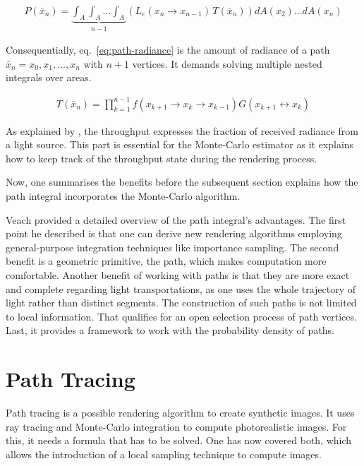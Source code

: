 \begin{align}
P(\bar{x}_n)=\underbrace{\int_A \int_A \dots \int_A}_{n-1}\left(L_e(x_n\rightarrow x_{n-1})\,T(\bar{x}_n) \right)dA(x_2)\dotso dA(x_n)
\label{eq:path-radiance}
\end{align}

Consequentially, eq.~\ref{eq:path-radiance} is the amount of radiance of a path $\bar{x}_n=x_0,x_1,\dotso,x_n$ with $n+1$ vertices.
It demands solving multiple nested integrals over areas.

\begin{align}
T(\bar{x}_n)=\prod_{k=1}^{n-1}f(x_{k+1}\rightarrow x_k\rightarrow x_{k-1})G(x_{k+1}\leftrightarrow x_{k})
\label{eq:path-throughput}
\end{align}

As explained by \cite{pharr_physically_2017}, the throughput expresses the fraction of received radiance from a light source.
This part is essential for the Monte-Carlo estimator as it explains how to keep track of the throughput state during the rendering process.

Now, one summarises the benefits before the subsequent section explains how the path integral incorporates the Monte-Carlo algorithm.

Veach \cite{veach_robust_1997} provided a detailed overview of the path integral's advantages.
The first point he described is that one can derive new rendering algorithms employing general-purpose integration techniques like importance sampling.
The second benefit is a geometric primitive, the path, which makes computation more comfortable.
Another benefit of working with paths is that they are more exact and complete regarding light transportations, as one uses the whole trajectory of light rather than distinct segments.
The construction of such paths is not limited to local information. 
That qualifies for an open selection process of path vertices.
Last, it provides a framework to work with the probability density of paths.

\section{Path Tracing}

Path tracing is a possible rendering algorithm to create synthetic images.
It uses ray tracing and Monte-Carlo integration to compute photorealistic images.
For this, it needs a formula that has to be solved.
One has now covered both, which allows the introduction of a local sampling technique to compute images.

